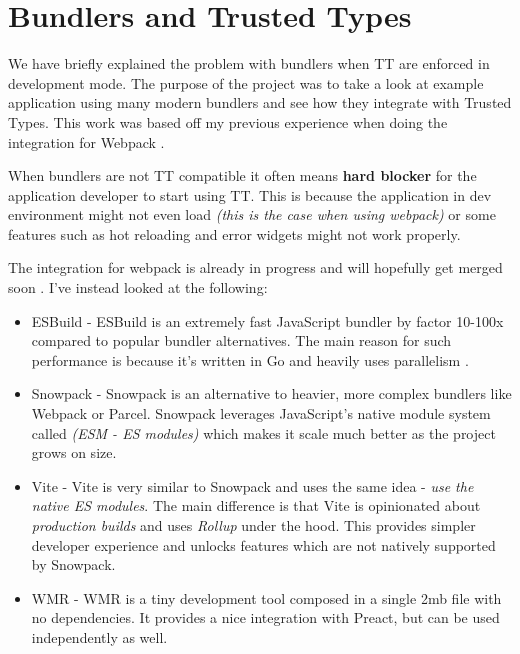 \chapter{Bundlers and Trusted Types}

\label{chapter:bundlers} %

We have briefly explained the problem with bundlers when TT are enforced in development mode. The
purpose of the project was to take a look at example application using many modern bundlers and see
how they integrate with Trusted Types. This work was based off my previous experience when doing the
integration for Webpack \cite{webpack_tt_integration}.

When bundlers are not TT compatible it often means \textbf{hard blocker} for the application
developer to start using TT. This is because the application in dev environment might not even load
\emph{(this is the case when using webpack)} or some features such as hot reloading and error
widgets might not work properly.

The integration for webpack is already in progress and will hopefully get merged soon
\cite{webpack_tt_integration_soon_to_merge}. I've instead looked at the following:

\begin{itemize}
  \item  ESBuild \cite{esbuild_web} - ESBuild is an extremely fast JavaScript bundler by factor
        10-100x compared to popular bundler alternatives. The main reason for such performance is
        because it's written in Go and heavily uses parallelism \cite{esbuild_fast}.
  \item  Snowpack \cite{snowpack_web} - Snowpack is an alternative to heavier, more complex bundlers
        like Webpack or Parcel. Snowpack leverages JavaScript's native module system called
        \emph{(ESM - ES modules)} which makes it scale much better as the project grows on size.
  \item  Vite \cite{vite_web} - Vite is very similar to Snowpack and uses the same idea - \emph{use
          the native ES modules}. The main difference is that Vite is opinionated about
        \emph{production builds} and uses \emph{Rollup} under the hood. This provides simpler
        developer experience and unlocks features which are not natively supported by Snowpack.
  \item  WMR \cite{wmr_web} - WMR is a tiny development tool composed in a single 2mb file with no
        dependencies. It provides a nice integration with Preact, but can be used independently as
        well.
\end{itemize}

